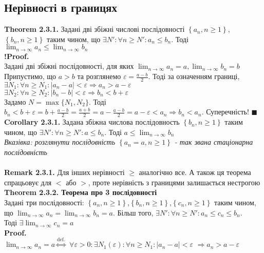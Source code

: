 \documentclass[a4paper, 14pt]{extarticle}
\def\bigline{\vspace{5mm}\\}
\def\bigline{\vspace{5mm}\\}
\def\qed{$\blacksquare$}
\def\sequence#1{$\displaystyle \left\{ {#1}, n\geq1 \right\}$}
\def\limitdef#1#2#3#4#5{$\displaystyle \forall #1 > 0: \exists #2(#1): \forall #3 \geq #2: \left|#4 - #5\right| < #1$}
\begin{document}
	\subsection{Нерівності в границях}	
	\textbf{Theorem 2.3.1.} Задані дві збіжні числові послідовності \sequence{a_n}, \sequence{b_n} таким чином, що $\exists N': \forall n \geq N': a_n \leq b_n$. Тоді\\ $\displaystyle \lim_{n \to \infty} a_n \leq \lim_{n \to \infty} b_n$\\
	\textbf{!Proof.}\\
	Задані дві збіжні послідовності, для яких $\displaystyle \lim_{n \to \infty} a_n =a, \lim_{n \to \infty} b_n = b$\\
	Припустимо, що $a>b$ та розглянемо $\displaystyle \varepsilon = \frac{a-b}{2}$. Тоді за означенням границі,\\
	$\exists N_1: \forall n \geq N_1:|a_n-a|<\varepsilon \Rightarrow a_n>a-\varepsilon$\\
	$\exists N_2: \forall n \geq N_2:|b_n-b|<\varepsilon \Rightarrow b_n<b+\varepsilon$\\
	Задамо $N=\max \{N_1, N_2\}$. Тоді\\ $\displaystyle b_n < b+\varepsilon = b + \frac{a-b}{2}=\frac{a+b}{2}=a-\frac{a-b}{2} = a-\varepsilon<a_n \Rightarrow b_n<a_n$. Суперечність! \qed
	\bigline
	\textbf{Corollary 2.3.1.} Задана збіжна числова послідовность \sequence{b_n} таким чином, що $\exists N': \forall n \geq N': a \leq b_n$. Тоді $\displaystyle a \leq \lim_{n \to \infty} b_n$\\
	\textit{Вказівка: розглянути послідовність \sequence{a_n=a} - так звана стаціонарна послідовність}\\
	\bigline
	\textbf{Remark 2.3.1.} Для інших нерівності $\geq$ аналогічно все. А також ця теорема спрацьовує для $<$ або $>$, проте нерівність з границями залишається нестрогою
	\bigline
	\textbf{Theorem 2.3.2. Теорема про 3 послідовності}\\
	Задані три послідовності: \sequence{a_n},\sequence{b_n},\sequence{c_n} таким чином, що $\displaystyle \lim_{n \to \infty} a_n = \displaystyle \lim_{n \to \infty} b_n = a$. Більш того, $\exists N': \forall n \geq N': a_n \leq c_n \leq b_n$.\\
	Тоді $\exists \displaystyle \lim_{n \to \infty} c_n = a$\\
	\textbf{Proof.}\\
	$\displaystyle \lim_{n \to \infty} a_n = a \overset{\textrm{def.}}{\iff}$ \limitdef{\varepsilon}{N_1}{n}{a_n}{a} $\Rightarrow a_n > a - \varepsilon$\\
\end{document}
